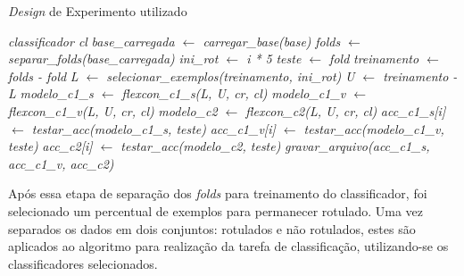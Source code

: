     
    \begin{algorithm}[H]
        \caption{\textit{Design} de Experimento utilizado}
        \label{alg:design}
        \SetAlgoLined
        \begin{algorithmic}[1]
            \REQUIRE \textit{classificador cl}
                \STATE \textit{base\_carregada $\leftarrow$ carregar\_base(base)}
                \STATE \textit{folds $\leftarrow$ separar\_folds(base\_carregada)}
                        \STATE \textit{ini\_rot $\leftarrow$ i * 5}
                            \STATE \textit{\textit{teste} $\leftarrow$ fold}
                            \STATE \textit{treinamento $\leftarrow$ folds - fold}
                            \STATE \textit{L $\leftarrow$ selecionar\_exemplos(treinamento, ini\_rot)}
                            \STATE \textit{U $\leftarrow$ treinamento - L}
                            \STATE \textit{modelo\_c1\_s $\leftarrow$ flexcon\_c1\_s(L, U, cr, cl)}
                            \STATE \textit{modelo\_c1\_v $\leftarrow$ flexcon\_c1\_v(L, U, cr, cl)}
                            \STATE \textit{modelo\_c2 $\leftarrow$ flexcon\_c2(L, U, cr, cl)}
                            \STATE \textit{acc\_c1\_s[i] $\leftarrow$ testar\_acc(modelo\_c1\_s, teste)}
                            \STATE \textit{acc\_c1\_v[i] $\leftarrow$ testar\_acc(modelo\_c1\_v, teste)}
                            \STATE \textit{acc\_c2[i] $\leftarrow$ testar\_acc(modelo\_c2, teste)}
                        \ENDFOR
                    \ENDFOR
                    \STATE \textit{gravar\_arquivo(acc\_c1\_s, acc\_c1\_v, acc\_c2)}
                \ENDFOR
            \ENDFOR
        \end{algorithmic}
    \end{algorithm}
	\begin{center}
        \vspace{-2em}
	\end{center}

    \vspace{-2em}
    Após essa etapa de separação dos \textit{folds} para treinamento do classificador, foi selecionado um percentual de exemplos para permanecer rotulado. Uma vez separados os dados em dois conjuntos: rotulados e não rotulados, estes são aplicados ao algoritmo para realização da tarefa de classificação, utilizando\hyp{se} os classificadores selecionados.

